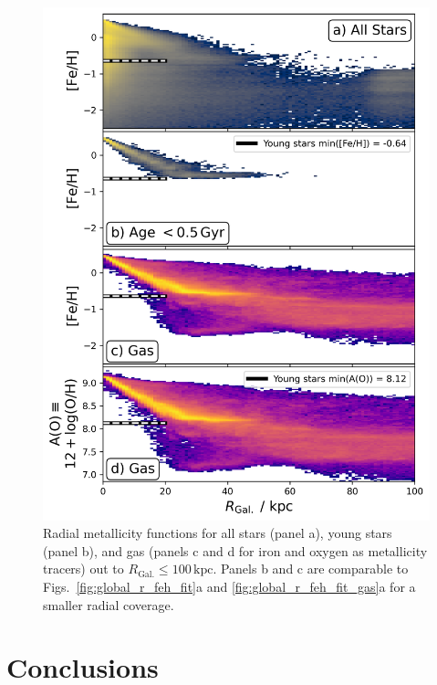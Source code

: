 \documentclass[fleqn,usenatbib]{mnras}
\begin{document}
\begin{figure}
    \centering
    \includegraphics[width=\columnwidth]{figures/trace_stars_and_gas_100kpc.png}
    \caption{Radial metallicity functions for all stars (panel a), young stars (panel b), and gas (panels c and d for iron and oxygen as metallicity tracers) out to $R_\mathrm{Gal.} \leq 100\,\mathrm{kpc}$. Panels b and c are comparable to Figs.~\ref{fig:global_r_feh_fit}a and \ref{fig:global_r_feh_fit_gas}a for a smaller radial coverage.}
    \label{fig:trace_stars_and_gas_100kpc}
\end{figure}

\section{Conclusions}
\label{sec:conc}
\end{document}
